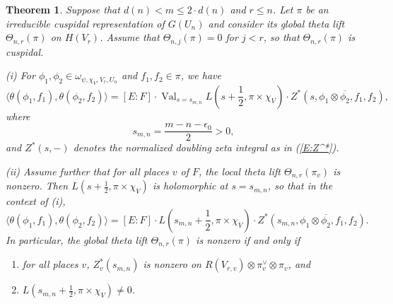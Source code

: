 \documentclass[10pt]{amsart}
\theoremstyle{plain}
\newtheorem{Thm}[equation]{Theorem}
\numberwithin{equation}{section}
\begin{document}
\begin{Thm}\label{T:Rallis}
  Suppose that $d(n) < m \leq 2\cdot d(n)$ and $r \leq n$. 
   Let $\pi$ be an irreducible cuspidal representation of $G(U_n)$
  and consider its global theta lift $\Theta_{n,r}(\pi)$ on
  $H(V_r)$. Assume that $\Theta_{n,j}(\pi) = 0$ for $j < r$, so that
  $\Theta_{n,r}(\pi)$   
 is cuspidal. 
 \vskip 5pt
 
 \noindent (i) For $\phi_1, \phi_2 \in \omega_{\psi, \chi_V, V_r,
   U_n}$ and $f_1, f_2 \in \pi$, we have
 \[  \langle \theta(\phi_1, f_1) , \theta(\phi_2, f_2) \rangle  
 =  [E:F]  \cdot {\operatorname{Val}}_{s=s_{m,n}} L(s + \frac{1}{2}, \pi \times \chi_V)  \cdot Z^*(s,
 \phi_1 \otimes \overline{\phi_2}, f_1, f_2), \]
 where 
 \[  s_{m,n} = \frac{m - n-\epsilon_0}{2}  > 0 ,\]
  and $Z^*(s, -)$ denotes the normalized doubling zeta integral as in (\ref{E:Z^*}).  

\vskip 5pt
\noindent (ii) Assume further that for all places $v$ of $F$, the
local theta lift $\Theta_{n,r}(\pi_v)$ is nonzero. Then $L(s+
\frac{1}{2},\pi \times \chi_V)$ is holomorphic at $s = s_{m,n}$, so that in the
context of (i),
 \[  
\langle \theta(\phi_1, f_1) , \theta(\phi_2, f_2) \rangle  
 =  [E:F]  \cdot L(s_{m,n} + \frac{1}{2}, \pi \times \chi_V)  \cdot Z^*(s_{m,n},
 \phi_1 \otimes \overline{\phi_2}, f_1, f_2).
 \]
In particular, the global theta lift $\Theta_{n,r}(\pi)$ is nonzero if and only if
 \begin{enumerate}
\item[(a)] for all places $v$,  $Z_v^*(s_{m,n})$ is nonzero on
  $R(V_{r,v}) \otimes \pi_v^{\vee} \otimes\pi_v$, and
\item[(b)] $L(s_{m,n} + \frac{1}{2}, \pi \times \chi_V)\ne  0$.  
\end{enumerate}

\end{Thm}
\end{document}
